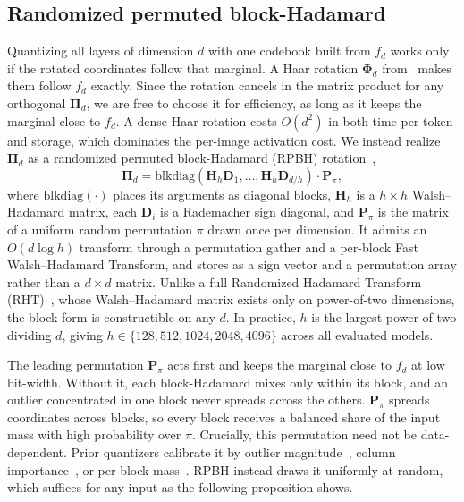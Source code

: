 \subsection{Randomized permuted block-Hadamard}
\label{sec:method:rpbh}
Quantizing all layers of dimension $d$ with one codebook built from $f_d$ works only if the rotated coordinates follow that marginal. A Haar rotation $\boldsymbol{\Phi}_d$ from~\cite{zandieh2025turboquant} makes them follow $f_d$ exactly. Since the rotation cancels in the matrix product for any orthogonal $\boldsymbol{\Pi}_d$, we are free to choose it for efficiency, as long as it keeps the marginal close to $f_d$. A dense Haar rotation costs $O(d^2)$ in both time per token and storage, which dominates the per-image activation cost. We instead realize $\boldsymbol{\Pi}_d$ as a randomized permuted block-Hadamard (RPBH) rotation~\cite{ailon2009fast, tropp2011improved},
\begin{equation}
\boldsymbol{\Pi}_d = \mathrm{blkdiag}(\mathbf{H}_h \mathbf{D}_1, \ldots, \mathbf{H}_h \mathbf{D}_{d/h}) \cdot \mathbf{P}_\pi,
\label{eq:rpbh}
\end{equation}
where $\mathrm{blkdiag}(\cdot)$ places its arguments as diagonal blocks, $\mathbf{H}_h$ is a $h \times h$ Walsh--Hadamard matrix, each $\mathbf{D}_i$ is a Rademacher sign diagonal, and $\mathbf{P}_\pi$ is the matrix of a uniform random permutation $\pi$ drawn once per dimension. It admits an $O(d \log h)$ transform through a permutation gather and a per-block Fast Walsh--Hadamard Transform, and stores as a sign vector and a permutation array rather than a $d \times d$ matrix. Unlike a full Randomized Hadamard Transform (RHT)~\cite{ashkboos2024quarot, tseng2024quip}, whose Walsh--Hadamard matrix exists only on power-of-two dimensions, the block form is constructible on any $d$. In practice, $h$ is the largest power of two dividing $d$, giving $h \in \{128, 512, 1024, 2048, 4096\}$ across all evaluated models.

The leading permutation $\mathbf{P}_\pi$ acts first and keeps the marginal close to $f_d$ at low bit-width. Without it, each block-Hadamard mixes only within its block, and an outlier concentrated in one block never spreads across the others. $\mathbf{P}_\pi$ spreads coordinates across blocks, so every block receives a balanced share of the input mass with high probability over $\pi$. Crucially, this permutation need not be data-dependent. Prior quantizers calibrate it by outlier magnitude~\cite{lin2024duquant}, column importance~\cite{gu2026lopro}, or per-block mass~\cite{sanjeet2026pushing}. RPBH instead draws it uniformly at random, which suffices for any input as the following proposition shows.


